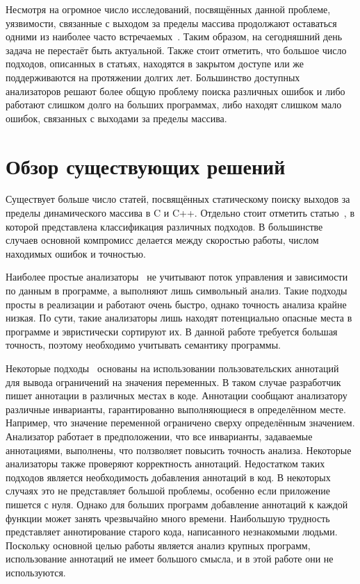 Несмотря на огромное число исследований, посвящённых данной проблеме,
уязвимости, связанные с выходом за пределы массива продолжают
оставаться одними из наиболее часто встречаемых~\cite{uscert}. Таким
образом, на сегодняшний день задача не перестаёт быть
актуальной. Также стоит отметить, что большое число подходов,
описанных в статьях, находятся в закрытом доступе или же
поддерживаются на протяжении долгих лет. Большинство доступных
анализаторов решают более общую проблему поиска различных ошибок и
либо работают слишком долго на больших программах, либо находят
слишком мало ошибок, связанных с выходами за пределы массива.

\section{Обзор существующих решений}

Существует больше число статей, посвящённых статическому поиску
выходов за пределы динамического массива в C и C++. Отдельно стоит
отметить статью~\cite{shahriar2010classification}, в которой
представлена классификация различных подходов. В большинстве случаев
основной компромисс делается между скоростью работы, числом находимых
ошибок и точностью.

Наиболее простые анализаторы~\cite{viega2002token,flawfinder} не
учитывают поток управления и зависимости по данным в программе, а
выполняют лишь символьный анализ. Такие подходы просты в реализации и
работают очень быстро, однако точность анализа крайне низкая. По сути,
такие анализаторы лишь находят потенциально опасные места в программе
и эвристически сортируют их. В данной работе требуется большая
точность, поэтому необходимо учитывать семантику программы.

Некоторые подходы~\cite{larochelle2001statically, hackett2006modular,
  dor2003cssv} основаны на использовании пользовательских аннотаций
для вывода ограничений на значения переменных. В таком случае
разработчик пишет аннотации в различных местах в коде. Аннотации
сообщают анализатору различные инварианты, гарантированно
выполняющиеся в определённом месте. Например, что значение переменной
ограничено сверху определённым значением. Анализатор работает в
предположении, что все инварианты, задаваемые аннотациями, выполнены,
что ползволяет повысить точность анализа. Некоторые анализаторы также
проверяют корректность аннотаций. Недостатком таких подходов
является необходимость добавления аннотаций в код. В некоторых случаях
это не представляет большой проблемы, особенно если приложение пишется
с нуля. Однако для больших программ добавление аннотаций к каждой
функции может занять чрезвычайно много времени. Наибольшую трудность
представляет аннотирование старого кода, написанного незнакомыми
людьми. Поскольку основной целью работы является анализ крупных
программ, использование аннотаций не имеет большого смысла, и в этой
работе они не используются.

